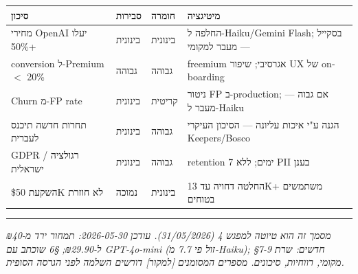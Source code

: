 \documentclass[11pt]{article}
\newcommand{\en}[1]{\textenglish{#1}}
\begin{document}
\begin{longtable}{|>{\raggedright\arraybackslash}p{4.0cm}|>{\raggedright\arraybackslash}p{1.8cm}|>{\raggedright\arraybackslash}p{1.8cm}|>{\raggedright\arraybackslash}p{6.5cm}|}
\hline
\rowcolor{hdr}
\textbf{סיכון} & \textbf{סבירות} & \textbf{חומרה} & \textbf{מיטיגציה} \\
\hline
\endhead
מחירי \en{OpenAI} יעלו \en{50\%+} & בינונית & בינונית & החלפה ל-\en{Haiku/Gemini Flash}; בסקייל — מעבר למקומי \\ \hline
\rowcolor{ltgray}
\en{conversion} ל-\en{Premium} $<$ \en{20\%} & גבוהה & גבוהה & \en{freemium} אגרסיבי; שיפור \en{UX} של \en{onboarding} \\ \hline
\en{Churn} מ-\en{FP rate} & בינונית & קריטית & ניטור \en{FP} ב-\en{production}; אם גבוה — מעבר ל-\en{Haiku} \\ \hline
\rowcolor{ltgray}
תחרות חדשה תיכנס לעברית & בינונית & גבוהה & הגנה ע"י איכות עליונה — הסיכון העיקרי \en{Keepers/Bosco} \\ \hline
\en{GDPR} / רגולציה ישראלית & בינונית & גבוהה & \en{retention 7} ימים; ללא \en{PII} בענן \\ \hline
\rowcolor{ltgray}
השקעת \en{\$50K} לא חוזרת & נמוכה & בינונית & החלטה דחויה עד \en{13K+} משתמשים בטוחים \\ \hline
\end{longtable}

\vspace{0.5cm}
\hrule
\vspace{0.3cm}
\begin{center}
\small \textit{מסמך זה הוא טיוטה למפגש \en{4} (\en{31/05/2026}). עודכן \en{2026-05-30}: תמחור ירד מ-₪\en{40} ל-₪\en{29.90}; \en{\S6} שוכתב עם \en{GPT-4o-mini} (זול פי \en{7.7} מ-\en{Haiku}); \en{\S7-9} חדשים: שרת מקומי, רווחיות, סיכונים. מספרים המסומנים \en{[}למקור\en{]} דורשים השלמה לפני הגרסה הסופית.}
\end{center}
\end{document}
